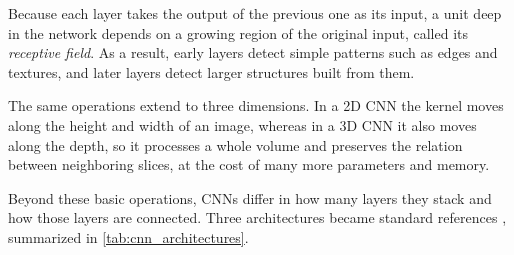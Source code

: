 Because each layer takes the output of the previous one as its input, a unit deep in the network depends on a growing region of the original input, called its \emph{receptive field}. As a result, early layers detect simple patterns such as edges and textures, and later layers detect larger structures built from them.

The same operations extend to three dimensions. In a 2D CNN the kernel moves along the height and width of an image, whereas in a 3D CNN it also moves along the depth, so it processes a whole volume and preserves the relation between neighboring slices, at the cost of many more parameters and memory.

Beyond these basic operations, CNNs differ in how many layers they stack and how those layers are connected. Three architectures became standard references \parencite{prince2023understanding}, summarized in \cref{tab:cnn_architectures}.


